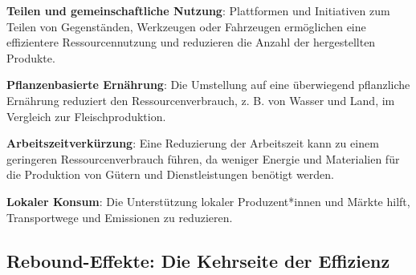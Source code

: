 \documentclass[
  nswissgerman,
  a4paper,
  DIV=11,
  numbers=noendperiod,
  oneside,
  openany]{scrreprt}
\begin{document}
\begin{tcolorbox}[enhanced jigsaw, arc=.35mm, bottomrule=.15mm, bottomtitle=1mm, breakable, colback=white, colbacktitle=quarto-callout-tip-color!10!white, colframe=quarto-callout-tip-color-frame, coltitle=black, left=2mm, leftrule=.75mm, opacityback=0, opacitybacktitle=0.6, rightrule=.15mm, title={Suffizienzstrategien in der Praxis: Beispiele}, titlerule=0mm, toprule=.15mm, toptitle=1mm]

\textbf{Teilen und gemeinschaftliche Nutzung}: Plattformen und
Initiativen zum Teilen von Gegenständen, Werkzeugen oder Fahrzeugen
ermöglichen eine effizientere Ressourcennutzung und reduzieren die
Anzahl der hergestellten Produkte.

\textbf{Pflanzenbasierte Ernährung}: Die Umstellung auf eine überwiegend
pflanzliche Ernährung reduziert den Ressourcenverbrauch, z. B. von
Wasser und Land, im Vergleich zur Fleischproduktion.

\textbf{Arbeitszeitverkürzung}: Eine Reduzierung der Arbeitszeit kann zu
einem geringeren Ressourcenverbrauch führen, da weniger Energie und
Materialien für die Produktion von Gütern und Dienstleistungen benötigt
werden.

\textbf{Lokaler Konsum}: Die Unterstützung lokaler Produzent*innen und
Märkte hilft, Transportwege und Emissionen zu reduzieren.

\end{tcolorbox}

\subsection{Rebound-Effekte: Die Kehrseite der
Effizienz}\label{rebound-effekte-die-kehrseite-der-effizienz}
\end{document}
